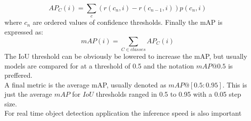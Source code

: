\begin{equation}
AP_C(i) = \sum_{c}{(r(c_{n},i) - r({c_{n-1},i}))p(c_n, i)}
\end{equation}
where $c_n$ are ordered values of confidence thresholds. Finally the mAP is expressed as:
\begin{equation}
mAP(i) = \sum_{C \in classes}{AP_C(i)}
\end{equation}
The IoU threshold can be obviously be lowered to increase the mAP, but usually models are compared for at a threshold of 0.5 and the notation $mAP@0.5$ is preffered. \\
A final metric is the average mAP, usually denoted as $mAP@[0.5:0.95]$. This is just the average $mAP$ for $IoU$ thresholds ranged in 0.5 to 0.95 with a 0.05 step size. \\
For real time object detection application the inference speed is also important
